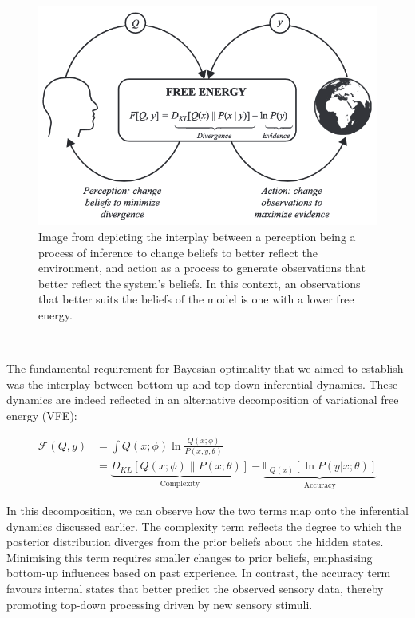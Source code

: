 \documentclass{article}
\begin{document}
\begin{figure}[htbp]
    \centering
    \includegraphics[scale=0.55]{images/vfe_minimisation.png}
    \caption{Image from \citet{parr2022ActiveInference} depicting the interplay between a perception being a process of inference to change beliefs to better reflect the environment, and action as a process to generate observations that better reflect the system's beliefs. In this context, an observations that better suits the beliefs of the model is one with a lower free energy.}
    \label{fig:vfe_minimisation}
\end{figure}

\

The fundamental requirement for Bayesian optimality that we aimed to establish was the interplay between bottom-up and top-down inferential dynamics. These dynamics are indeed reflected in an alternative decomposition of variational free energy (VFE):

\begin{equation}
\begin{aligned}
	\mathcal{F}(Q, y) &=  \int Q(x; \phi) \ln \frac{Q(x; \phi)}{P(x, y; \theta)} \\ 
	&= \underbrace{D_{KL}\left[ Q(x; \phi) \| P(x; \theta)  \right]}_{\text{Complexity}} - \underbrace{\mathbb{E}_{Q(x)}\left[ \ln P(y | x; \theta) \right]}_{\text{Accuracy}}
\end{aligned}
\end{equation}


In this decomposition, we can observe how the two terms map onto the inferential dynamics discussed earlier. The complexity term reflects the degree to which the posterior distribution diverges from the prior beliefs about the hidden states. Minimising this term requires smaller changes to prior beliefs, emphasising bottom-up influences based on past experience.  In contrast, the accuracy term favours internal states that better predict the observed sensory data, thereby promoting top-down processing driven by new sensory stimuli.
\end{document}
